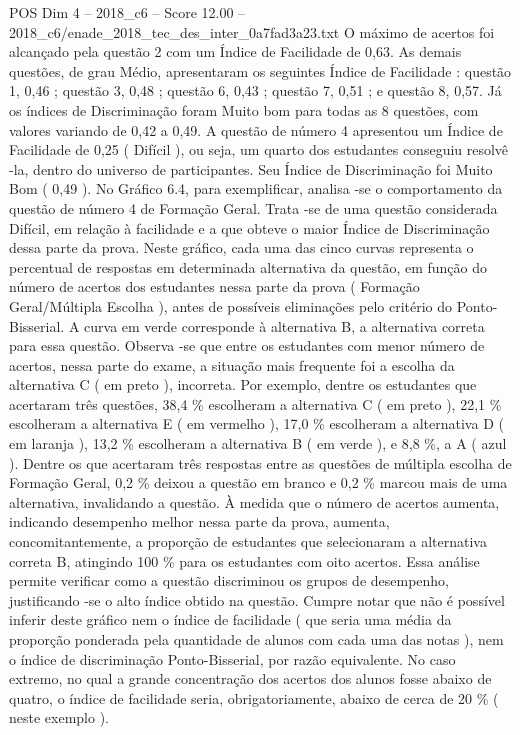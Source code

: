 \begin{textsample}{POS Dim 4 – 2018\_c6 – Score 12.00 – 2018\_c6/enade\_2018\_tec\_des\_inter\_0a7fad3a23.txt}
O máximo de acertos foi alcançado pela questão 2 com um Índice de Facilidade de 0,63.
As demais questões, de grau Médio, apresentaram os seguintes Índice de Facilidade : questão 1, 0,46 ; questão 3, 0,48 ; questão 6, 0,43 ; questão 7, 0,51 ; e questão 8, 0,57.
Já os índices de Discriminação foram Muito bom para todas as 8 questões, com valores variando de 0,42 a 0,49.
A questão de número 4 apresentou um Índice de Facilidade de 0,25 ( Difícil ), ou seja, um quarto dos estudantes conseguiu resolvê -la, dentro do universo de participantes.
Seu Índice de Discriminação foi Muito Bom ( 0,49 ).
No Gráfico 6.4, para exemplificar, analisa -se o comportamento da questão de número 4 de Formação Geral.
Trata -se de uma questão considerada Difícil, em relação à facilidade e a que obteve o maior Índice de Discriminação dessa parte da prova.
Neste gráfico, cada uma das cinco curvas representa o percentual de respostas em determinada alternativa da questão, em função do número de acertos dos estudantes nessa parte da prova ( Formação Geral/Múltipla Escolha ), antes de possíveis eliminações pelo critério do Ponto-Bisserial.
A curva em verde corresponde à alternativa B, a alternativa correta para essa questão.
Observa -se que entre os estudantes com menor número de acertos, nessa parte do exame, a situação mais frequente foi a escolha da alternativa C ( em preto ), incorreta.
Por exemplo, dentre os estudantes que acertaram três questões, 38,4 \% escolheram a alternativa C ( em preto ), 22,1 \% escolheram a alternativa E ( em vermelho ), 17,0 \% escolheram a alternativa D ( em laranja ), 13,2 \% escolheram a alternativa B ( em verde ), e 8,8 \%, a A ( azul ).
Dentre os que acertaram três respostas entre as questões de múltipla escolha de Formação Geral, 0,2 \% deixou a questão em branco e 0,2 \% marcou mais de uma alternativa, invalidando a questão.
À medida que o número de acertos aumenta, indicando desempenho melhor nessa parte da prova, aumenta, concomitantemente, a proporção de estudantes que selecionaram a alternativa correta B, atingindo 100 \% para os estudantes com oito acertos.
Essa análise permite verificar como a questão discriminou os grupos de desempenho, justificando -se o alto índice obtido na questão.
Cumpre notar que não é possível inferir deste gráfico nem o índice de facilidade ( que seria uma média da proporção ponderada pela quantidade de alunos com cada uma das notas ), nem o índice de discriminação Ponto-Bisserial, por razão equivalente.
No caso extremo, no qual a grande concentração dos acertos dos alunos fosse abaixo de quatro, o índice de facilidade seria, obrigatoriamente, abaixo de cerca de 20 \% ( neste exemplo ).

\end{textsample}
